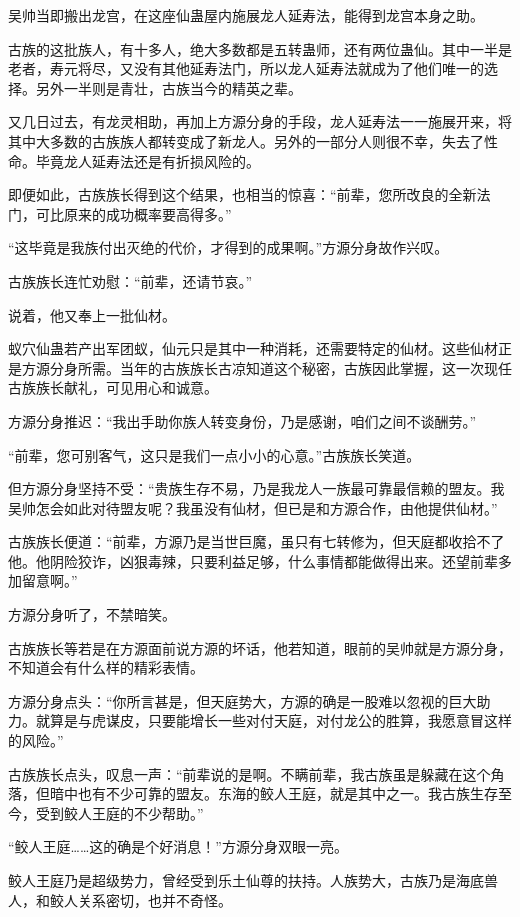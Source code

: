 \begin{this_body}
吴帅当即搬出龙宫，在这座仙蛊屋内施展龙人延寿法，能得到龙宫本身之助。

古族的这批族人，有十多人，绝大多数都是五转蛊师，还有两位蛊仙。其中一半是老者，寿元将尽，又没有其他延寿法门，所以龙人延寿法就成为了他们唯一的选择。另外一半则是青壮，古族当今的精英之辈。

又几日过去，有龙灵相助，再加上方源分身的手段，龙人延寿法一一施展开来，将其中大多数的古族族人都转变成了新龙人。另外的一部分人则很不幸，失去了性命。毕竟龙人延寿法还是有折损风险的。

即便如此，古族族长得到这个结果，也相当的惊喜：“前辈，您所改良的全新法门，可比原来的成功概率要高得多。”

“这毕竟是我族付出灭绝的代价，才得到的成果啊。”方源分身故作兴叹。

古族族长连忙劝慰：“前辈，还请节哀。”

说着，他又奉上一批仙材。

蚁穴仙蛊若产出军团蚁，仙元只是其中一种消耗，还需要特定的仙材。这些仙材正是方源分身所需。当年的古族族长古凉知道这个秘密，古族因此掌握，这一次现任古族族长献礼，可见用心和诚意。

方源分身推迟：“我出手助你族人转变身份，乃是感谢，咱们之间不谈酬劳。”

“前辈，您可别客气，这只是我们一点小小的心意。”古族族长笑道。

但方源分身坚持不受：“贵族生存不易，乃是我龙人一族最可靠最信赖的盟友。我吴帅怎会如此对待盟友呢？我虽没有仙材，但已是和方源合作，由他提供仙材。”

古族族长便道：“前辈，方源乃是当世巨魔，虽只有七转修为，但天庭都收拾不了他。他阴险狡诈，凶狠毒辣，只要利益足够，什么事情都能做得出来。还望前辈多加留意啊。”

方源分身听了，不禁暗笑。

古族族长等若是在方源面前说方源的坏话，他若知道，眼前的吴帅就是方源分身，不知道会有什么样的精彩表情。

方源分身点头：“你所言甚是，但天庭势大，方源的确是一股难以忽视的巨大助力。就算是与虎谋皮，只要能增长一些对付天庭，对付龙公的胜算，我愿意冒这样的风险。”

古族族长点头，叹息一声：“前辈说的是啊。不瞒前辈，我古族虽是躲藏在这个角落，但暗中也有不少可靠的盟友。东海的鲛人王庭，就是其中之一。我古族生存至今，受到鲛人王庭的不少帮助。”

“鲛人王庭……这的确是个好消息！”方源分身双眼一亮。

鲛人王庭乃是超级势力，曾经受到乐土仙尊的扶持。人族势大，古族乃是海底兽人，和鲛人关系密切，也并不奇怪。


\end{this_body}
